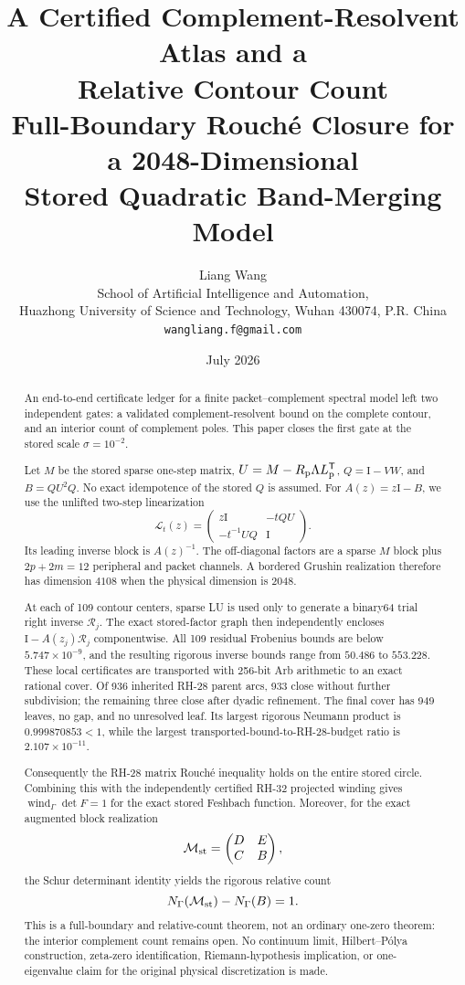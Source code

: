 \documentclass[11pt]{article}
\title{\textbf{A Certified Complement-Resolvent Atlas and a\\
Relative Contour Count}\\[0.35em]
\large Full-Boundary Rouch\'e Closure for a 2048-Dimensional\\
Stored Quadratic Band-Merging Model}
\author{Liang Wang\\
\small School of Artificial Intelligence and Automation,\\[-0.2em]
\small Huazhong University of Science and Technology, Wuhan 430074, P.R. China\\
\small \texttt{wangliang.f@gmail.com}}
\date{July 2026}
\theoremstyle{definition}
\theoremstyle{remark}
\newcommand{\C}{\mathbb C}
\newcommand{\Id}{\mathrm I}
\newcommand{\wind}{\operatorname{wind}}
\begin{document}
\maketitle

\begin{abstract}
An end-to-end certificate ledger for a finite packet--complement spectral
model left two independent gates: a validated complement-resolvent bound on
the complete contour, and an interior count of complement poles.  This paper
closes the first gate at the stored scale $\sigma=10^{-2}$.

Let $M$ be the stored sparse one-step matrix,
$U=M-R_{\rm p}\Lambda L_{\rm p}^{\mathsf T}$,
$Q=\Id-VW$, and $B=QU^2Q$.  No exact idempotence of the stored $Q$ is
assumed.  For $A(z)=z\Id-B$, we use the unlifted two-step linearization
\[
 \mathcal L_t(z)=
 \begin{pmatrix}z\Id&-tQU\\-t^{-1}UQ&\Id\end{pmatrix}.
\]
Its leading inverse block is $A(z)^{-1}$.  The off-diagonal factors are a
sparse $M$ block plus $2p+2m=12$ peripheral and packet channels.  A bordered
Grushin realization therefore has dimension $4108$ when the physical
dimension is $2048$.

At each of 109 contour centers, sparse LU is used only to generate a
binary64 trial right inverse $\mathcal R_j$.  The exact stored-factor graph
then independently encloses
$\Id-A(z_j)\mathcal R_j$ componentwise.  All 109 residual Frobenius bounds
are below $5.747\times10^{-9}$, and the resulting rigorous inverse bounds
range from $50.486$ to $553.228$.  These local certificates are transported
with 256-bit Arb arithmetic to an exact rational cover.  Of 936 inherited
RH-28 parent arcs, 933 close without further subdivision; the remaining
three close after dyadic refinement.  The final cover has 949 leaves, no
gap, and no unresolved leaf.  Its largest rigorous Neumann product is
$0.999870853<1$, while the largest transported-bound-to-RH-28-budget ratio is
$2.107\times10^{-11}$.

Consequently the RH-28 matrix Rouch\'e inequality holds on the entire stored
circle.  Combining this with the independently certified RH-32 projected
winding gives $\wind_\Gamma\det F=1$ for the exact stored Feshbach function.
Moreover, for the exact augmented block realization
\[
 \mathcal M_{\rm st}=\begin{pmatrix}D&E\\C&B\end{pmatrix},
\]
the Schur determinant identity yields the rigorous relative count
\[
 N_\Gamma(\mathcal M_{\rm st})-N_\Gamma(B)=1.
\]
This is a full-boundary and relative-count theorem, not an ordinary one-zero
theorem: the interior complement count remains open.  No continuum limit,
Hilbert--P\'olya construction, zeta-zero identification, Riemann-hypothesis
implication, or one-eigenvalue claim for the original physical
discretization is made.
\end{abstract}
\end{document}
